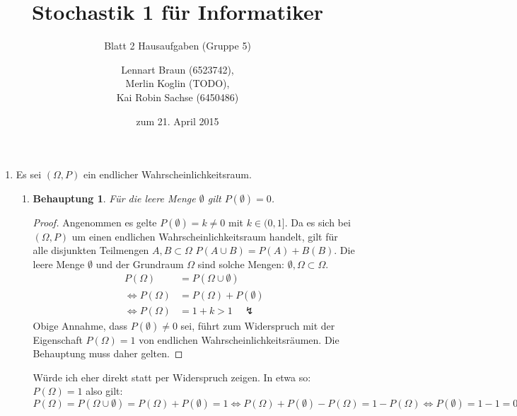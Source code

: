 \documentclass[a4paper]{scrartcl}
\title{Stochastik 1 für Informatiker}
\subtitle{Blatt 2 Hausaufgaben (Gruppe 5)}
\author{
    Lennart Braun (6523742), \\
    Merlin Koglin (TODO), \\
    Kai Robin Sachse (6450486)
}
\date{zum 21. April 2015}
\newtheorem*{behaupt}{Behauptung}
\newcommand{\gdw}{\Leftrightarrow}
\begin{document}
\maketitle

\begin{enumerate}[label=\bfseries\arabic*.]
    \item Es sei $(\Omega, P)$ ein endlicher Wahrscheinlichkeitsraum.
        \begin{enumerate}[label=(\roman*)]
            \item
                \begin{behaupt}
                    Für die leere Menge $\emptyset$ gilt $P(\emptyset) = 0$.
                \end{behaupt}
                \begin{proof}
                    Angenommen es gelte $P(\emptyset) = k \neq 0$ mit
                    $k \in (0, 1]$.
                    Da es sich bei $(\Omega, P)$ um einen endlichen
                    Wahrscheinlichkeitsraum handelt, gilt für alle disjunkten
                    Teilmengen $A, B \subset \Omega$
                    $P(A \cup B) = P(A) + B(B)$.
                    Die leere Menge $\emptyset$ und der Grundraum $\Omega$ sind
                    solche Mengen: $\emptyset, \Omega \subset \Omega$.
                    \begin{equation}
                        \begin{split}
                            P(\Omega) &= P(\Omega \cup \emptyset) \\
                            \gdw P(\Omega) &= P(\Omega) + P(\emptyset) \\
                            \gdw P(\Omega) &= 1 + k > 1 \quad \lightning
                        \end{split}
                    \end{equation}
                    Obige Annahme, dass $P(\emptyset) \neq 0$ sei, führt zum
                    Widerspruch mit der Eigenschaft $P(\Omega) = 1$ von
                    endlichen Wahrscheinlichkeitsräumen.
                    Die Behauptung muss daher gelten.
                \end{proof}
                
                Würde ich eher direkt statt per Widerspruch zeigen. In etwa so: $P(\Omega)=1$ also gilt: $P(\Omega)=P(\Omega\cup\emptyset)=P(\Omega)+P(\emptyset)=1\Leftrightarrow P(\Omega)+P(\emptyset)-P(\Omega)=1-P(\Omega)\Leftrightarrow P(\emptyset)=1-1=0$


\end{enumerate}
\end{enumerate}
\end{document}
